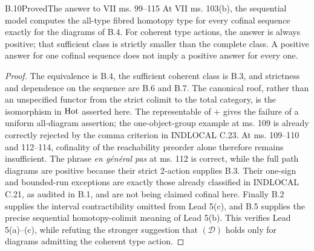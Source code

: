 \begin{claim}{B.10}{Proved}{The answer to VII ms. 99--115}
\label{B:manuscript}
At VII ms. 103(b), the sequential model computes the all-type
fibred homotopy type for every cofinal sequence exactly for the
diagrams of B.4. For coherent type actions, the answer is always
positive; that sufficient class is strictly smaller than the
complete class. A positive answer for one cofinal sequence does
not imply a positive answer for every one.
\end{claim}
\begin{proof}
The equivalence is B.4, the sufficient coherent class is B.3,
and strictness and dependence on the sequence are B.6 and B.7.
The canonical roof, rather than an unspecified functor from the
strict colimit to the total category, is the isomorphism in
$\operatorname{Hot}$ asserted here. The representable of $+$ gives the
failure of a uniform all-diagram assertion; the one-object-group
example at ms. 109 is already correctly rejected by the comma
criterion in INDLOCAL C.23. At ms. 109--110 and 112--114,
cofinality of the reachability preorder alone therefore remains
insufficient. The phrase \emph{en g\'en\'eral pas} at ms. 112
is correct, while the full path diagrams are positive because
their strict 2-action supplies B.3. Their one-sign and bounded-run
exceptions are exactly those already classified in INDLOCAL
C.21, as audited in B.1, and are not being claimed cofinal here.
Finally B.2 supplies the interval contractibility omitted from
Lead 5(c), and B.5 supplies the precise sequential homotopy-colimit
meaning of Lead 5(b). This verifies Lead 5(a)--(c), while
refuting the stronger suggestion that $(\mathcal D)$ holds
only for diagrams admitting the coherent type action.
\end{proof}
